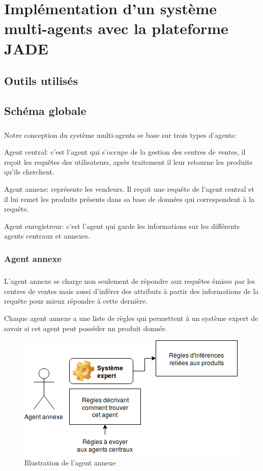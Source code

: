 \chapter{Implémentation d'un système multi-agents avec la plateforme JADE}
\section{Outils utilisés}
\section{Schéma globale}
\paragraph{}
Notre conception du système multi-agents se base sur trois types d’agents:

Agent central: c’est l’agent qui s’occupe de la gestion des centres de ventes, il reçoit les requêtes des utilisateurs, après traitement il leur retourne les produits qu’ils cherchent.

Agent annexe: représente les vendeurs. Il reçoit une requête de l’agent central et il lui remet les produits présents dans sa base de données qui correspondent  à la requête.

Agent enregistreur: c’est l’agent qui garde les informations sur les différents agents centraux et annexes.
\newpage
\subsection{Agent annexe}
\paragraph{}
L’agent annexe se charge non seulement de répondre aux requêtes émises  par les centres de ventes mais aussi d’inférer des attributs à partir des informations de la requête pour mieux répondre à cette dernière.

Chaque agent annexe a une liste de règles qui permettent à un système expert de savoir si cet agent peut posséder un produit donnée.
\begin{figure}[H]
	\centering
	\includegraphics[scale=0.75]{imgs/annexeAgent.png}
	\caption{Illustration de l'agent annexe}
	\label{fig:annexeAgent}
\end{figure}

